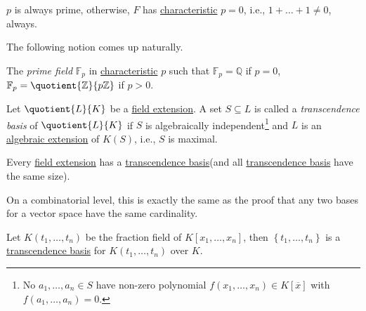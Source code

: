 
\begin{remark}
	\(p\) is always prime, otherwise, \(F\) has \hyperref[def:characteristic]{characteristic} \(p = 0\), i.e., \(1 + \dots + 1 \neq 0\), always.
\end{remark}

The following notion comes up naturally.

\begin{definition}\label{def:prime-field}
	The \emph{prime field} \(\mathbb{F} _p\) in \hyperref[def:characteristic]{characteristic} \(p\) such that \(\mathbb{F} _p = \mathbb{Q} \) if \(p = 0\), \(\mathbb{F} _p = \quotient{\mathbb{Z} }{p\mathbb{Z} } \) if \(p > 0\).
\end{definition}

\begin{definition}\label{def:transcendence-basis}
	Let \(\quotient{L}{K} \) be a \hyperref[def:field-extension]{field extension}. A set \(S \subseteq L\) is called a \emph{transcendence basis} of \(\quotient{L}{K} \) if \(S\) is algebraically independent\footnote{No \(a_1, \dots , a_n\in S\) have non-zero polynomial \(f(x_1, \dots , x_n) \in K[\overline{x} ]\) with \(f(a_1, \dots , a_n) = 0\).} and \(L\) is an \hyperref[def:algebraic-extension]{algebraic extension} of \(K(S)\), i.e., \(S\) is maximal.
\end{definition}

\begin{remark}
	Every \hyperref[def:field-extension]{field extension} has a \hyperref[def:transcendence-basis]{transcendence basis}(and all \hyperref[def:transcendence-basis]{transcendence basis} have the same size).
\end{remark}
\begin{explanation}
	On a combinatorial level, this is exactly the same as the proof that any two bases for a vector space have the same cardinality.
\end{explanation}

\begin{eg}
	Let \(K(t_1, \dots , t_n)\) be the fraction field of \(K[x_1, \dots , x_n]\), then \(\left\{ t_1, \dots , t_n \right\} \) is a \hyperref[def:transcendence-basis]{transcendence basis} for \(K(t_1, \dots , t_n)\) over \(K\).
\end{eg}

